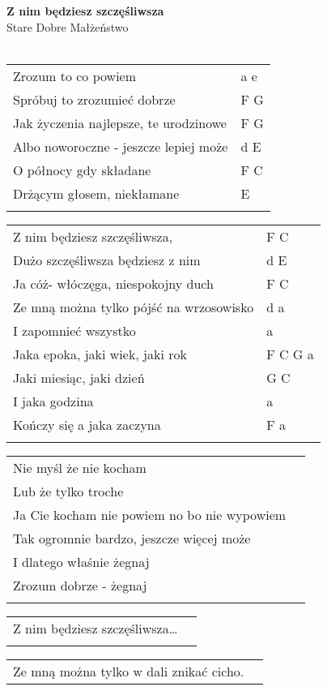 \documentclass[a5paper]{article}
\begin{document}


\noindent
\fontsize{12pt}{15pt}\selectfont
\textbf{Z nim będziesz szczęśliwsza} \\
\fontsize{8pt}{10pt}\selectfont
Stare Dobre Małżeństwo \\ \\
\fontsize{10pt}{12pt}\selectfont
{}
\begin{tabular}{@{}p{8.50cm}p{3cm}@{}}
\noindent
Zrozum to co powiem & a e \\
Spróbuj to zrozumieć dobrze & F G \\
Jak życzenia najlepsze, te urodzinowe & F G \\
Albo noworoczne - jeszcze lepiej może & d E \\
O północy gdy składane & F C \\
Drżącym głosem, niekłamane & E \\ \\
\end{tabular}

\noindent
\begin{tabular}{@{}p{7.50cm}p{3cm}@{}}
Z nim będziesz szczęśliwsza, & F C \\
Dużo szczęśliwsza będziesz z nim & d E \\
Ja cóż- włóczęga, niespokojny duch & F C \\
Ze mną można tylko pójść na wrzosowisko & d a \\
I zapomnieć wszystko & a \\
Jaka epoka, jaki wiek, jaki rok & F C G a \\
Jaki miesiąc, jaki dzień & G C \\
I jaka godzina & a \\
Kończy się a jaka zaczyna & F a \\ \\
\end{tabular}

\noindent
\begin{tabular}{@{}p{7.50cm}p{3cm}@{}}
Nie myśl że nie kocham \\
Lub że tylko troche \\
Ja Cie kocham nie powiem no bo nie wypowiem \\
Tak ogromnie bardzo, jeszcze więcej może \\
I dlatego właśnie żegnaj \\
Zrozum dobrze - żegnaj \\ \\
\end{tabular}

\noindent
\begin{tabular}{@{}p{7.50cm}p{3cm}@{}}
Z nim będziesz szczęśliwsza… \\ \\
\end{tabular}

\noindent
\begin{tabular}{@{}p{7.50cm}p{3cm}@{}}
Ze mną można tylko w dali znikać cicho.
\end{tabular}
\end{document}
